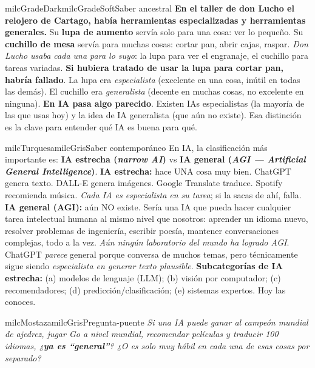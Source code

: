 \documentclass[11pt,letterpaper]{article}
\begin{document}
\begin{softbox}{milcGradeDark}{milcGradeSoft}{Saber ancestral}
\textbf{En el taller de don Lucho el relojero de Cartago, había herramientas especializadas y herramientas generales.} Su \textbf{lupa de aumento} servía solo para una cosa: ver lo pequeño. Su \textbf{cuchillo de mesa} servía para muchas cosas: cortar pan, abrir cajas, raspar. \emph{Don Lucho usaba cada una para lo suyo}: la lupa para ver el engranaje, el cuchillo para tareas variadas. \textbf{Si hubiera tratado de usar la lupa para cortar pan, habría fallado}. La lupa era \emph{especialista} (excelente en una cosa, inútil en todas las demás). El cuchillo era \emph{generalista} (decente en muchas cosas, no excelente en ninguna). \textbf{En IA pasa algo parecido}. Existen IAs especialistas (la mayoría de las que usas hoy) y la idea de IA generalista (que aún no existe). Esa distinción es la clave para entender qué IA es buena para qué.
\end{softbox}

\begin{softbox}{milcTurquesa}{milcGris}{Saber contemporáneo}
En IA, la clasificación más importante es: \textbf{IA estrecha (\emph{narrow AI})} vs \textbf{IA general (\emph{AGI --- Artificial General Intelligence})}. \textbf{IA estrecha:} hace UNA cosa muy bien. ChatGPT genera texto. DALL-E genera imágenes. Google Translate traduce. Spotify recomienda música. \emph{Cada IA es especialista en su tarea}; si la sacas de ahí, falla. \textbf{IA general (AGI):} aún NO existe. Sería una IA que pueda hacer cualquier tarea intelectual humana al mismo nivel que nosotros: aprender un idioma nuevo, resolver problemas de ingeniería, escribir poesía, mantener conversaciones complejas, todo a la vez. \emph{Aún ningún laboratorio del mundo ha logrado AGI}. ChatGPT \emph{parece} general porque conversa de muchos temas, pero técnicamente sigue siendo \emph{especialista en generar texto plausible}. \textbf{Subcategorías de IA estrecha:} (a) modelos de lenguaje (LLM); (b) visión por computador; (c) recomendadores; (d) predicción/clasificación; (e) sistemas expertos. Hoy las conoces.
\end{softbox}

\begin{softbox}{milcMostaza}{milcGris}{Pregunta-puente}
\textit{Si una IA puede ganar al campeón mundial de ajedrez, jugar Go a nivel mundial, recomendar películas y traducir 100 idiomas, ¿\textbf{ya es ``general''}? ¿O es solo muy hábil en cada una de esas cosas por separado?}
\end{softbox}
\end{document}
